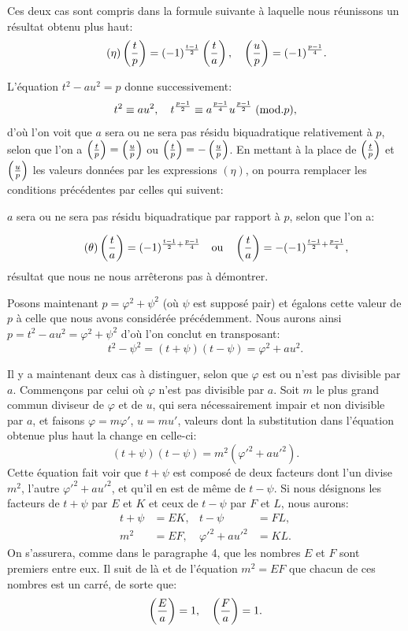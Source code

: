 \par\indent
Ces deux cas sont compris dans la formule suivante à laquelle nous
réunissons un résultat obtenu plus haut:
\begin{equation*}\tag{$\eta$}
\left(\frac{t}{p}\right)=(-1)^{\frac{t-1}{2}}\left(\frac{t}{a}\right),\quad
\left(\frac{u}{p}\right)=(-1)^{\frac{p-1}{4}}.
\end{equation*}
\par\indent
L'équation $t^2-au^2=p$ donne successivement:
\[
t^2\equiv au^2,\quad t^{\frac{p-1}{2}}\equiv a^{\frac{p-1}{4}}u^{\frac{p-1}{2}}\;(\mathrm{mod}.p),
\]
d'où l'on voit que $a$ sera ou ne sera pas résidu biquadratique relativement à
$p$, selon que l'on a $\left(\frac{t}{p}\right)=\left(\frac{u}{p}\right)$ ou $\left(\frac{t}{p}\right)=-\left(\frac{u}{p}\right)$.
En mettant à la place de $\left(\frac{t}{p}\right)$ et $\left(\frac{u}{p}\right)$ les valeurs données par les
expressions $(\eta)$, on pourra remplacer les conditions précédentes par celles qui suivent:
\par\noindent\hspace*{.12\linewidth}\begin{minipage}{.86\linewidth}
$a$ sera ou ne sera pas résidu biquadratique par rapport à $p$, selon que l'on a:
\end{minipage}
\begin{equation*}\tag{$\theta$}
\left(\frac{t}{a}\right)=(-1)^{\frac{t-1}{2}+\frac{p-1}{4}}\quad\text{ou}\quad
\left(\frac{t}{a}\right)=-(-1)^{\frac{t-1}{2}+\frac{p-1}{4}},
\end{equation*}
\noindent
résultat que nous ne nous arrêterons pas à démontrer.
\par\indent
Posons maintenant $p=\varphi^2+\psi^2$ (où $\psi$ est supposé pair) et égalons cette
valeur de $p$ à celle que nous avons considérée précédemment. Nous aurons
ainsi $p=t^2-au^2=\varphi^2+\psi^2$ d'où l'on conclut en transposant:
\[
t^2-\psi^2=(t+\psi)(t-\psi)=\varphi^2+au^2.
\]
\par\indent
Il y a maintenant deux cas à distinguer, selon que $\varphi$ est ou n'est pas
divisible par $a$. Commençons par celui où $\varphi$ n'est pas divisible par $a$. Soit
$m$ le plus grand commun diviseur de $\varphi$ et de $u$, qui sera nécessairement
impair et non divisible par $a$, et faisons $\varphi=m\varphi'$, $u=mu'$, valeurs dont la
substitution dans l'équation obtenue plus haut la change en celle-ci:
\[
(t+\psi)(t-\psi)=m^2(\varphi'^2+au'^2).
\]
Cette équation fait voir que $t+\psi$ est composé de deux facteurs dont l'un
divise $m^2$, l'autre $\varphi'^2+au'^2$, et qu'il en est de même de $t-\psi$. Si nous désignons
les facteurs de $t+\psi$ par $E$ et $K$ et ceux de $t-\psi$ par $F$ et $L$, nous aurons:
\[
\begin{aligned}
t+\psi&=EK, &t-\psi&=FL,\\
m^2&=EF, &\varphi'^2+au'^2&=KL.
\end{aligned}
\]
On s'assurera, comme dans le paragraphe 4, que les nombres $E$ et $F$ sont
premiers entre eux. Il suit de là et de l'équation $m^2=EF$ que chacun de
ces nombres est un carré, de sorte que:
\[
\left(\frac{E}{a}\right)=1,\quad\left(\frac{F}{a}\right)=1.
\]
